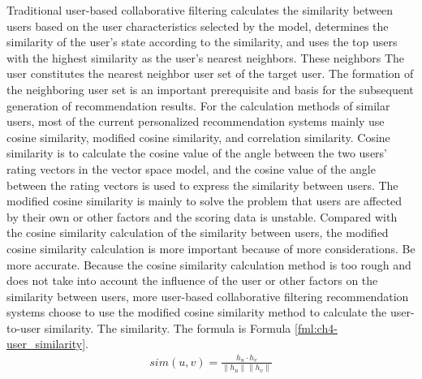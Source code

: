 Traditional user-based collaborative filtering calculates the similarity between users based on the user characteristics selected by the model, determines the similarity of the user's state according to the similarity, and uses the top users with the highest similarity as the user's nearest neighbors. These neighbors The user constitutes the nearest neighbor user set of the target user. The formation of the neighboring user set is an important prerequisite and basis for the subsequent generation of recommendation results. For the calculation methods of similar users, most of the current personalized recommendation systems mainly use cosine similarity, modified cosine similarity, and correlation similarity. Cosine similarity is to calculate the cosine value of the angle between the two users' rating vectors in the vector space model, and the cosine value of the angle between the rating vectors is used to express the similarity between users. The modified cosine similarity is mainly to solve the problem that users are affected by their own or other factors and the scoring data is unstable. Compared with the cosine similarity calculation of the similarity between users, the modified cosine similarity calculation is more important because of more considerations. Be more accurate. Because the cosine similarity calculation method is too rough and does not take into account the influence of the user or other factors on the similarity between users, more user-based collaborative filtering recommendation systems choose to use the modified cosine similarity method to calculate the user-to-user similarity. The similarity. The formula is Formula \ref{fml:ch4-user_similarity}.
\begin{align}
  sim(u, v)=\frac{h_{u} \cdot h_{v}}{\|h_{u}\|\|h_{v}\|}\label{fml:ch4-user_similarity}
\end{align}





